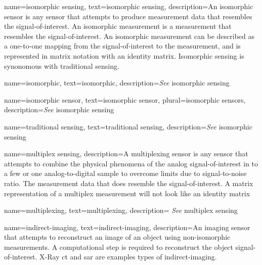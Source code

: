 



{
name={isomorphic sensing},
text={isomorphic sensing},
description={An isomorphic sensor is any sensor that attempts to produce measurement data that resembles the signal-of-interest. An isomorphic measurement is a measurement that resembles the signal-of-interest. An isomorphic measurement can be described as a one-to-one mapping from the signal-of-interest to the measurement, and is represented in matrix notation with an identity matrix. Isomorphic sensing is synonomous with traditional sensing.}
}

{
name={isomorphic},
text={isomorphic},
description={\emph{See} \gls{isomorphic sensing}}
}

{
name={isomorphic sensor},
text={isomorphic sensor},
plural={isomorphic sensors},
description={\emph{See} \gls{isomorphic sensing}}
}

{
name={traditional sensing},
text={traditional sensing},
description={\emph{See} \gls{isomorphic sensing}}
}

{
name={multiplex sensing},
description={A multiplexing sensor is any sensor that attempts to combine the physical phenomena of the analog signal-of-interest in to a few or one analog-to-digital sample to overcome limits due to signal-to-noise ratio. The measurement data that does resemble the signal-of-interest. A matrix representation of a multiplex measurement will not look like an identity matrix}
}

{
name={multiplexing},
text={multiplexing},
description={ \emph{See} \gls{multiplex sensing}}
}

{
name={indirect-imaging},
text={indirect-imaging},
description={An imaging sensor that attempts to reconstruct an image of an object using non-isomorphic measurements. A computational step is required to reconstruct the object signal-of-interest. X-Ray \gls{ct} and \gls{sar} are examples types of indirect-imaging.  }
}

